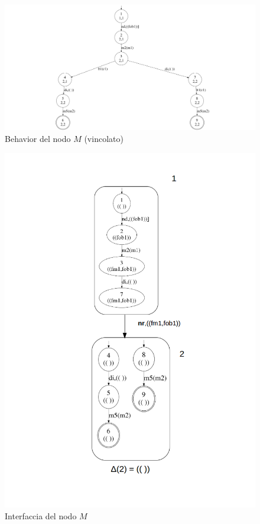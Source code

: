 \begin{figure}[htbp]
\centering
\includegraphics[scale=0.16]{./Img/sac/bhv_vincolato.png}
\caption{Behavior del nodo $M$ (vincolato)}
\label{fig:bhv_m}
\end{figure}



\begin{figure}[htbp]
\centering
\includegraphics[scale=0.6]{./Img/sac/interfaccia_m.png}
\caption{Interfaccia del nodo $M$}
\label{fig:inter_m}
\end{figure}


